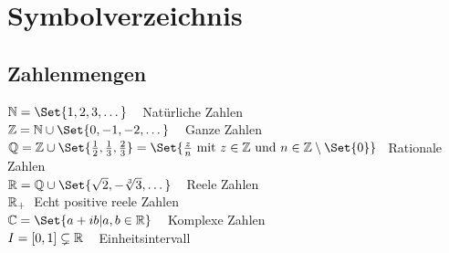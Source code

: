 

\chapter*{Symbolverzeichnis}


\section*{Zahlenmengen}
$\MdN = \Set{1, 2, 3, \dots} \;\;\;$ Natürliche Zahlen\\
$\mdz = \mdn \cup \Set{0, -1, -2, \dots} \;\;\;$ Ganze Zahlen\\
$\mdq = \mdz \cup \Set{\frac{1}{2}, \frac{1}{3}, \frac{2}{3}} = \Set{\frac{z}{n} \text{ mit } z \in \mdz \text{ und } n \in \mdz \setminus \Set{0}} \;\;\;$Rationale Zahlen\\
$\mdr = \mdq \cup \Set{\sqrt{2}, -\sqrt[3]{3}, \dots}\;\;\;$ Reele Zahlen\\
$\mathbb{R}_+\;$ Echt positive reele Zahlen\\
$\mdc = \Set{a+ib|a,b \in \mdr}\;\;\;$ Komplexe Zahlen\\
$I = [0,1] \subsetneq \mathbb{R}\;\;\;$ Einheitsintervall\\

\settowidth{}
\setlength\mylengthb{\dimexpr\columnwidth-\mylengtha-2\tabcolsep\relax}